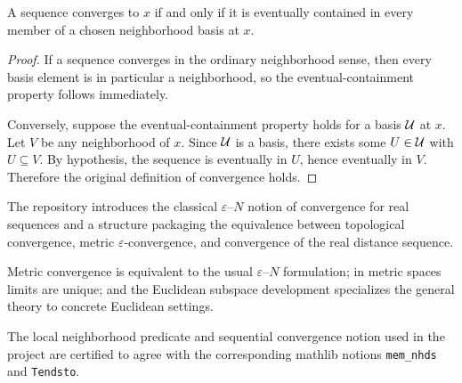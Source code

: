 \begin{proposition}\label{prop:tendsto-basis-2-18}
\leanok
A sequence converges to $x$ if and only if it is eventually contained in every member of a chosen neighborhood basis at $x$.
\begin{proof}
If a sequence converges in the ordinary neighborhood sense, then every basis element is in particular a neighborhood, so the eventual-containment property follows immediately.

Conversely, suppose the eventual-containment property holds for a basis $\mathcal{U}$ at $x$. Let $V$ be any neighborhood of $x$. Since $\mathcal{U}$ is a basis, there exists some $U\in\mathcal{U}$ with $U\subseteq V$. By hypothesis, the sequence is eventually in $U$, hence eventually in $V$. Therefore the original definition of convergence holds.
\end{proof}
\end{proposition}

\begin{definition}\label{def:metric-convergence-2-19}
\leanok
The repository introduces the classical $\varepsilon$--$N$ notion of convergence for real sequences and a structure packaging the equivalence between topological convergence, metric $\varepsilon$-convergence, and convergence of the real distance sequence.
\end{definition}

\begin{proposition}\label{prop:metric-convergence-2-19-2-21}
\leanok
Metric convergence is equivalent to the usual $\varepsilon$--$N$ formulation; in metric spaces limits are unique; and the Euclidean subspace development specializes the general theory to concrete Euclidean settings.
\end{proposition}

\begin{remark}\label{rem:mathlib-certs-2}
\leanok
The local neighborhood predicate and sequential convergence notion used in the project are certified to agree with the corresponding mathlib notions \texttt{mem\_nhds} and \texttt{Tendsto}.
\end{remark}

